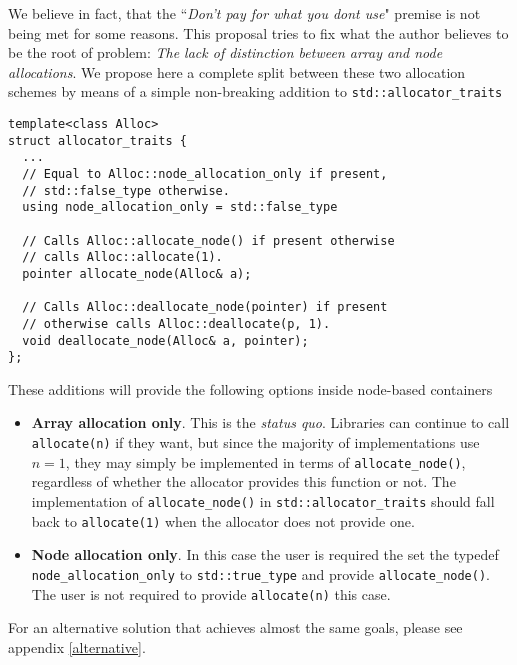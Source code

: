 \documentclass[11pt]{article}
\begin{document}
We believe in fact, that the ``{\it Don't pay for what you dont use}" premise
is not being met for some reasons. This proposal tries to fix what the author
believes to be the root of problem: {\it The lack of distinction between array
and node allocations}.  We propose here a complete split between these
two allocation schemes by means of a simple non-breaking addition to
\texttt{std::allocator\_traits}
\medskip
\begin{lstlisting}
template<class Alloc>
struct allocator_traits {
  ...
  // Equal to Alloc::node_allocation_only if present,
  // std::false_type otherwise.
  using node_allocation_only = std::false_type

  // Calls Alloc::allocate_node() if present otherwise
  // calls Alloc::allocate(1).
  pointer allocate_node(Alloc& a);

  // Calls Alloc::deallocate_node(pointer) if present
  // otherwise calls Alloc::deallocate(p, 1).
  void deallocate_node(Alloc& a, pointer);
};
\end{lstlisting}
These additions will provide the following options inside node-based
containers
\begin{itemize}
\item {\bf Array allocation only}.
This is the {\it status quo}. Libraries can continue to call
\texttt{allocate(n)} if they want, but since the majority of implementations
use $n = 1$, they may simply be implemented in terms of
\texttt{allocate\_node()}, regardless of whether the allocator provides this
function or not. The implementation of \texttt{allocate\_node()} in
\texttt{std::allocator\_traits} should fall back to \texttt{allocate(1)} 
when the allocator does not provide one.

\item {\bf Node allocation only}.
In this case the user is required the set the typedef \texttt{node\_allocation\_only}
to \texttt{std::true\_type} and provide \texttt{allocate\_node()}. The user is
not required to provide \texttt{allocate(n)} this case.
\end{itemize}

For an alternative solution that achieves almost the same goals, please see
appendix \ref{alternative}.
\end{document}

